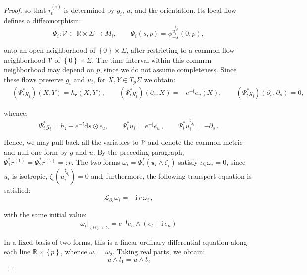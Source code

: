 \documentclass[10pt,reqno,a4paper]{amsart}
\theoremstyle{plain}
\theoremstyle{definition}
\theoremstyle{remark}
\theoremstyle{remark}
\def\dd{\mathrm{d}}
\def\cL{\mathcal{L}}
\def\cL{\mathcal{L}}
\def\fre{\mathfrak{e}}
\renewcommand{\(}{ (}
\renewcommand{\)}{ )}
\newcommand{\frf}{\mathfrak{f}}
\begin{document}
\begin{proof}
\noindent
so that $r^{(i)}_t$ is determined by $g_i$, $u_i$ and the orientation. Its local flow defines a diffeomorphism:
\begin{equation*}
\Psi_i\colon\mathcal V\subset\mathbb R\times\Sigma\longrightarrow M_i,\qquad
\Psi_i(s,p)=\phi_{-s}^{u_i^{\sharp_{g_i}}}(0,p),
\end{equation*}

\noindent
onto an open neighborhood of $\left\{ 0\right\}\times\Sigma$, after restricting to a common flow neighborhood $\mathcal V$ of $\left\{ 0\right\}\times\Sigma$. The time interval within this common neighborhood may depend on $p$, since we do not assume completeness. Since these flows preserve $g_i$ and $u_i$, for $X,Y\in T_p\Sigma$ we obtain:
\begin{eqnarray*}
& (\Psi_i^{\ast}g_i)(X,Y)=h_{\fre}(X,Y),\qquad
(\Psi_i^{\ast}g_i)(\partial_s,X)=-e^{-\frf}e_u(X),\qquad
(\Psi_i^{\ast}g_i)(\partial_s,\partial_s)=0,
\end{eqnarray*}

\noindent
whence:
\begin{equation*}
\Psi_i^{\ast}g_i=h_{\fre}-e^{-\frf}\dd s\odot e_u,\qquad
\Psi_i^{\ast}u_i=e^{-\frf}e_u\, , \qquad \Psi_i^{\ast}u_i^{\sharp_{g_i}} = -\partial_s\, .
\end{equation*}

\noindent 
Hence, we may pull back all the variables to $\mathcal V$ and denote the common metric and null one-form by $g$ and $u$. By the preceding paragraph, $\Psi_1^{\ast}r^{(1)} = \Psi_2^{\ast}r^{(2)} =: r$. The two-forms $\omega_i = \Psi_i^{\ast}(u_i\wedge\zeta_i)$ satisfy $\iota_{\partial_s}\omega_i = 0$, since $u_i$ is isotropic, $\zeta_i(u_i^{\sharp_{g_i}}) = 0$ and, furthermore, the following transport equation is satisfied: 
\begin{equation*}
\cL_{\partial_s}\omega_i = -\mathrm{i}\, r\, \omega_i\, ,
\end{equation*}

\noindent
with the same initial value:
\begin{equation*}
\omega_i|_{\left\{ 0\right\}\times\Sigma} = e^{-\frf}e_u\wedge(e_l + \mathrm{i}\, e_n)
\end{equation*}

\noindent
In a fixed basis of two-forms, this is a linear ordinary differential equation along each line $\mathbb{R}\times\left\{ p\right\}$, whence $\omega_1 = \omega_2$. Taking real parts, we obtain:
\begin{equation*}
  u\wedge l_1 = u\wedge l_2  
\end{equation*}


\end{proof}
\end{document}
